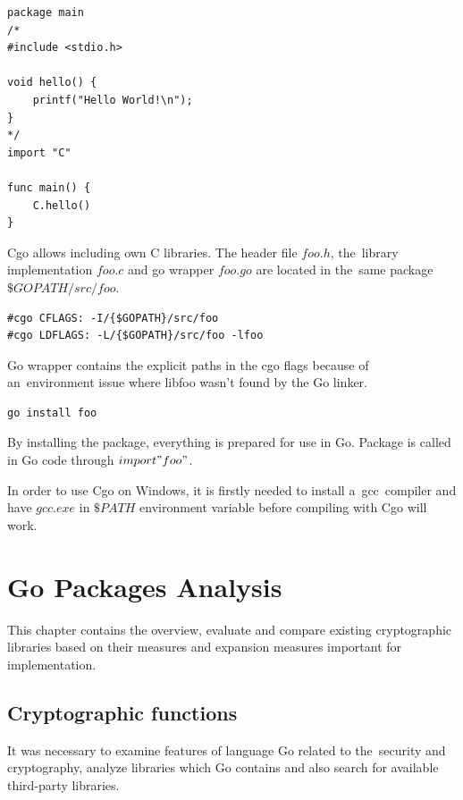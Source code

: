 \documentclass[
  twoside, 12pt, 
  printed, %
  notable,   %
  lof,     %
  lot,     %
]{fithesis3}
\begin{document}
\begin{lstlisting}
package main
/*
#include <stdio.h>

void hello() {
	printf("Hello World!\n");
}
*/
import "C"

func main() {
	C.hello()
}
\end{lstlisting}

Cgo allows including own C libraries. The header file $foo.h$, the~library implementation 
$foo.c$ and go wrapper $foo.go$ are located in the~same package $\$GOPATH/src/foo$. 
\begin{lstlisting}
#cgo CFLAGS: -I/{$GOPATH}/src/foo
#cgo LDFLAGS: -L/{$GOPATH}/src/foo -lfoo
\end{lstlisting}
Go wrapper contains the explicit paths in the cgo flags because of an~environment issue where 
libfoo wasn’t found by the Go linker.
\begin{lstlisting} 
go install foo 
\end{lstlisting}
By installing the package, everything is prepared for use in Go. Package is called in Go code 
through $import "foo"$.

In order to use Cgo on Windows, it is firstly needed to install a~gcc~compiler and have 
$gcc.exe$ in $\$PATH$ environment variable before compiling with Cgo will work.

\nocite{cgo-command}
\nocite{bloggolangorg}
\nocite{cgo-wiki}

\nocite{chisnall2012go}
\nocite{harris_2015}
\nocite{kozyra_2014}

\chapter{Go Packages Analysis} %
This chapter contains the overview, evaluate and compare existing cryptographic libraries based on 
their measures and expansion measures important for implementation.

\section{Cryptographic functions}
It was necessary to examine features of language Go related to the~security and cryptography, analyze 
libraries which Go contains and also search for available third-party libraries. 
\end{document}
